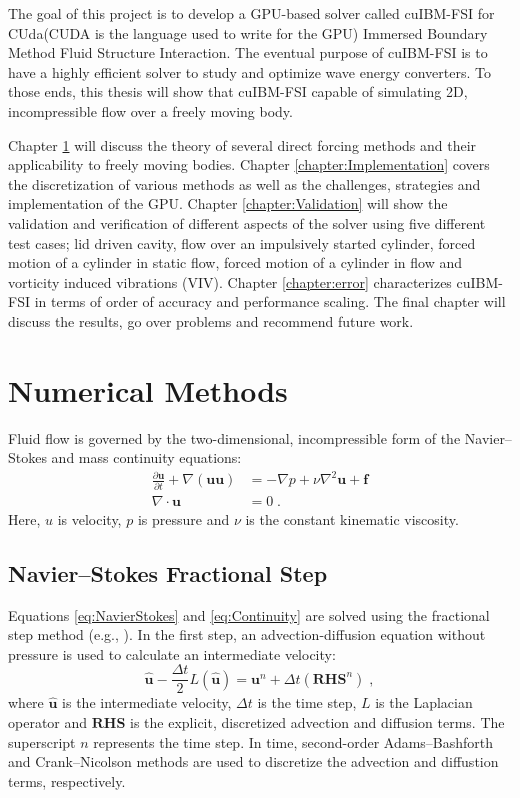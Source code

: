 \documentclass[onehalf,11pt]{beavtex}
\begin{document}
The goal of this project is to develop a GPU-based solver called cuIBM-FSI for CUda(CUDA is the language used to write for the GPU) Immersed Boundary Method Fluid Structure Interaction. 
The eventual purpose of cuIBM-FSI is to have a highly efficient solver to study and optimize wave energy converters. 
To those ends, this thesis will show that cuIBM-FSI capable of simulating 2D, incompressible flow over a freely moving body. 

Chapter \ref{chapter:Numerical Methods} will discuss the theory of several direct forcing methods and their applicability to freely moving bodies. 
Chapter \ref{chapter:Implementation} covers the discretization of various methods as well as the challenges, strategies and implementation of the GPU.
Chapter \ref{chapter:Validation} will show the validation and verification of different aspects of the solver using five different test cases; lid driven cavity, flow over an impulsively started cylinder, forced motion of a cylinder in static flow, forced motion of a cylinder in flow and vorticity induced vibrations (VIV). 
Chapter \ref{chapter:error} characterizes cuIBM-FSI in terms of order of accuracy and performance scaling. 
The final chapter will discuss the results, go over problems and recommend future work.

\chapter{Numerical Methods}\label{chapter:Numerical Methods}
Fluid flow is governed by the two-dimensional, incompressible form of the Navier--Stokes and mass continuity equations:
\begin{align}
\frac{\partial \textbf{u}}{\partial t} + \nabla ( \textbf{uu} ) &= -\nabla p + \nu\nabla^{2}\textbf{u} + \textbf{f} \label{eq:NavierStokes} \\
\nabla \cdot \textbf{u} &= 0 \label{eq:Continuity} \;.
\end{align}
Here, $u$ is velocity, $p$ is pressure and $\nu$ is the constant kinematic viscosity.

\section{Navier--Stokes Fractional Step}\label{NM:NavierStokes}
Equations \eqref{eq:NavierStokes} and \eqref{eq:Continuity} are solved using the fractional step method (e.g., \cite{Perot1993}). 
In the first step, an advection-diffusion equation without pressure is used to calculate an intermediate velocity:
\begin{equation}\label{eq:Intermediate Velocity}
\hat{\textbf{u}} - \frac{\Delta t}{2}L(\hat{\textbf{u}}) = \textbf{u}^n + \Delta t(\textbf{RHS}^n) \;,
\end{equation}
where $\hat{\textbf{u}}$ is the intermediate velocity, $\Delta t$ is the time step, $L$ is the Laplacian operator and $\textbf{RHS}$ is the explicit, discretized advection and diffusion terms.
The superscript $n$ represents the time step.
In time, second-order Adams--Bashforth and Crank--Nicolson methods are used to discretize the advection and diffustion terms, respectively.
\end{document}
